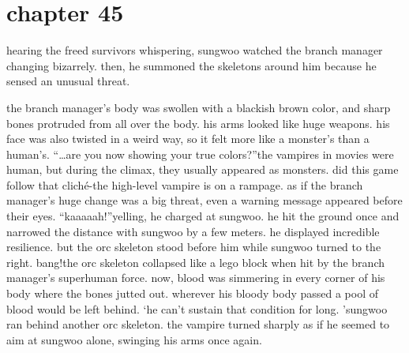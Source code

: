 \section{chapter 45}

                            hearing the freed survivors whispering, sungwoo watched the branch manager changing bizarrely.
 then, he summoned the skeletons around him because he sensed an unusual threat.





the branch manager’s body was swollen with a blackish brown color, and sharp bones protruded from all over the body.
 his arms looked like huge weapons.
 his face was also twisted in a weird way, so it felt more like a monster’s than a human’s.
“…are you now showing your true colors?”the vampires in movies were human, but during the climax, they usually appeared as monsters.
 did this game follow that cliché-the high-level vampire is on a rampage.
as if the branch manager’s huge change was a big threat, even a warning message appeared before their eyes.
“kaaaaah!”yelling, he charged at sungwoo.
 he hit the ground once and narrowed the distance with sungwoo by a few meters.
 he displayed incredible resilience.
 but the orc skeleton stood before him while sungwoo turned to the right.
bang!the orc skeleton collapsed like a lego block when hit by the branch manager’s superhuman force.
 now, blood was simmering in every corner of his body where the bones jutted out.
wherever his bloody body passed a pool of blood would be left behind.
‘he can’t sustain that condition for long.
’sungwoo ran behind another orc skeleton.
 the vampire turned sharply as if he seemed to aim at sungwoo alone, swinging his arms once again.

